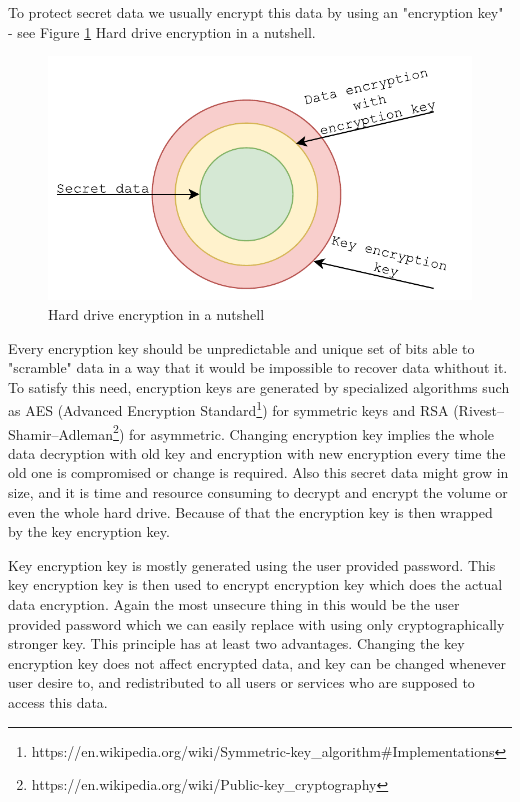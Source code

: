 To protect secret data we usually encrypt this data by using an "encryption key" - see Figure \ref{fig:encdata} Hard drive encryption in a nutshell.
\begin{figure}[h]
    \centering
    \includegraphics[scale=0.7]{figures/HowWeEncryptData.pdf}
    \caption{Hard drive encryption in a nutshell}
    \label{fig:encdata}
\end{figure}
Every encryption key should be unpredictable and unique set of bits able to "scramble" data in a way that it would be impossible to recover data whithout it.
To satisfy this need, encryption keys are generated by specialized algorithms such as AES (Advanced Encryption Standard\footnote{https://en.wikipedia.org/wiki/Symmetric-key\_algorithm\#Implementations}) for symmetric keys and RSA (Rivest–Shamir–Adleman\footnote{https://en.wikipedia.org/wiki/Public-key\_cryptography}) for asymmetric.
Changing encryption key implies the whole data decryption with old key and encryption with new encryption every time the old one is compromised or change is required.
Also this secret data might grow in size, and it is time and resource consuming to decrypt and encrypt the volume or even the whole hard drive.
Because of that the encryption key is then wrapped by the key encryption key.

Key encryption key is mostly generated using the user provided password.
This key encryption key is then used to encrypt encryption key which does the actual data encryption.
Again the most unsecure thing in this would be the user provided password which we can easily replace with using only cryptographically stronger key.
This principle has at least two advantages.
Changing the key encryption key does not affect encrypted data, and key can be changed whenever user desire to, and redistributed to all users or services who are supposed to access this data.

